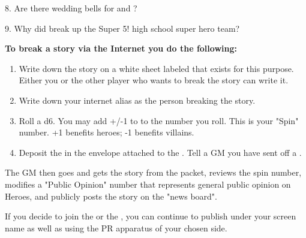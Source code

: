 \documentclass[green]{LRSguildcamp1}
\begin{document}
8. Are there wedding bells for \cYoungest{\MYsupername} and \cYS{\MYsupername} ?

9. Why did \cYoungest{\MYsupername} break up the Super 5! high school super hero team?

\textbf{To break a story via the Internet you do the following:
}\begin{enumerate}
\item Write down the story on a white sheet labeled \wPressRelease{} that exists for this purpose. Either you or the other player who wants to break the story can write it. 
\item Write down your internet alias as the person breaking the story.  
\item Roll a d6.  You may add +/-1 to to the number you roll. This is your "Spin" number.  +1 benefits heroes; -1 benefits villains.
\item Deposit the \wPressRelease{} in the envelope attached to the \sComputer{}. 
Tell a GM you have sent off a \wPressRelease{}.
\end{enumerate}

The GM then goes and gets the story from the packet, reviews the spin number, modifies a "Public Opinion" number that represents general public opinion on Heroes, and publicly posts the story on the "news board". 

If you decide to join the \cHeroLeague{\intro} or the \cVillainCompact{\intro}, you can continue to publish under your screen name as well as using the PR apparatus of your chosen side. 




\end{document}
